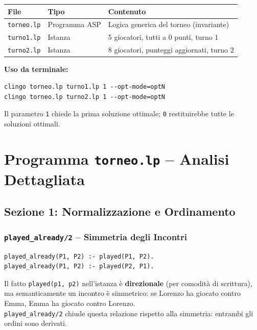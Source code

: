 \documentclass[12pt,a4paper]{article}
\begin{document}
\begin{center}
\begin{tabular}{lll}
\toprule
\textbf{File} & \textbf{Tipo} & \textbf{Contenuto} \\
\midrule
\texttt{torneo.lp} & Programma ASP & Logica generica del torneo (invariante) \\
\texttt{turno1.lp} & Istanza & 5 giocatori, tutti a 0 punti, turno 1 \\
\texttt{turno2.lp} & Istanza & 8 giocatori, punteggi aggiornati, turno 2 \\
\bottomrule
\end{tabular}
\end{center}

\textbf{Uso da terminale:}
\begin{lstlisting}[numbers=none,backgroundcolor=\color{black!5}]
clingo torneo.lp turno1.lp 1 --opt-mode=optN
clingo torneo.lp turno2.lp 1 --opt-mode=optN
\end{lstlisting}
Il parametro \texttt{1} chiede la prima soluzione ottimale; \texttt{0} restituirebbe
tutte le soluzioni ottimali.

\section{Programma \texttt{torneo.lp} -- Analisi Dettagliata}

\subsection{Sezione 1: Normalizzazione e Ordinamento}

\subsubsection{\texttt{played\_already/2} -- Simmetria degli Incontri}

\begin{lstlisting}
played_already(P1, P2) :- played(P1, P2).
played_already(P1, P2) :- played(P2, P1).
\end{lstlisting}

Il fatto \texttt{played(p1, p2)} nell'istanza è \textbf{direzionale} (per
comodità di scrittura), ma semanticamente un incontro è simmetrico: se
Lorenzo ha giocato contro Emma, Emma ha giocato contro Lorenzo. \\
\texttt{played\_already/2} chiude questa relazione rispetto alla simmetria:
entrambi gli ordini sono derivati.
\end{document}
